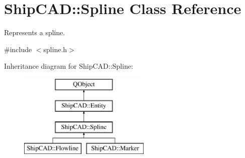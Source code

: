 \hypertarget{classShipCAD_1_1Spline}{}\section{Ship\+C\+AD\+:\+:Spline Class Reference}
\label{classShipCAD_1_1Spline}


Represents a spline.  




{\ttfamily \#include $<$spline.\+h$>$}

Inheritance diagram for Ship\+C\+AD\+:\+:Spline\+:\begin{figure}[H]
\begin{center}
\leavevmode
\includegraphics[height=4.000000cm]{classShipCAD_1_1Spline}
\end{center}
\end{figure}
